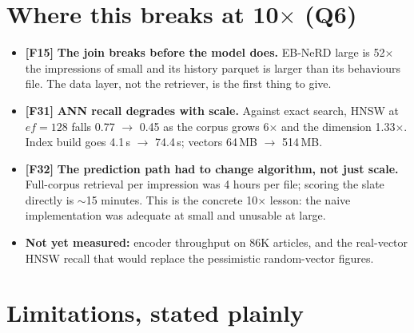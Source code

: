 \documentclass[11pt,a4paper]{article}
\newcommand{\finding}[1]{\textcolor{blue!55!black}{\textbf{[#1]}}}
\begin{document}
\section{Where this breaks at 10$\times$ (Q6)}

\begin{itemize}[leftmargin=1.4em,itemsep=3pt]
  \item \finding{F15} \textbf{The join breaks before the model does.} EB-NeRD large is 52$\times$
        the impressions of small and its history parquet is larger than its behaviours file. The
        data layer, not the retriever, is the first thing to give.
  \item \finding{F31} \textbf{ANN recall degrades with scale.} Against exact search, HNSW at
        $ef{=}128$ falls 0.77 $\rightarrow$ 0.45 as the corpus grows 6$\times$ and the dimension
        1.33$\times$. Index build goes 4.1\,s $\rightarrow$ 74.4\,s; vectors 64\,MB
        $\rightarrow$ 514\,MB.
  \item \finding{F32} \textbf{The prediction path had to change algorithm, not just scale.}
        Full-corpus retrieval per impression was 4 hours per file; scoring the slate directly is
        $\sim$15 minutes. This is the concrete 10$\times$ lesson: the naive implementation was
        adequate at small and unusable at large.
  \item \textbf{Not yet measured:} encoder throughput on 86K articles, and the real-vector HNSW
        recall that would replace the pessimistic random-vector figures.
\end{itemize}

\section{Limitations, stated plainly}
\end{document}
